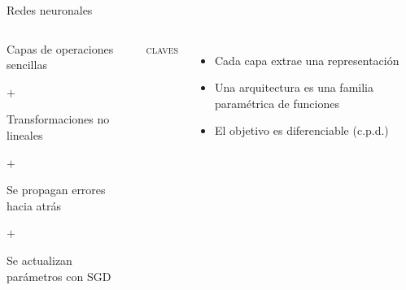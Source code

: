 \documentclass[13.5pt,aspectratio=169]{beamer}
\begin{document}
     \begin{frame}{Redes neuronales}
      \begin{columns}
         \begin{fullpageitemize}
            \item \begin{center}Capas de operaciones sencillas\end{center}
            \vspace{.2em}\item\begin{center}$+$\end{center}
            \vspace{.2em}\item \begin{center}Transformaciones no lineales\end{center}
            \vspace{.2em}\item\begin{center}$+$\end{center}%
            \vspace{.2em}\item \begin{center}Se propagan errores hacia atrás\end{center}
            \vspace{.2em}\item\begin{center}$+$\end{center}%
            \vspace{.2em}\item \begin{center}Se actualizan parámetros con SGD\end{center}%
      \end{fullpageitemize}
      \textsc{\color{colorblue}claves}\\
      \begin{itemize}
         \item Cada capa extrae una representación\vspace{.5em}
         \item Una arquitectura es una familia paramétrica de funciones\vspace{.5em}
         \item El objetivo es diferenciable (c.p.d.)
      \end{itemize}

      \end{columns}
\end{frame}
     
\end{document}
